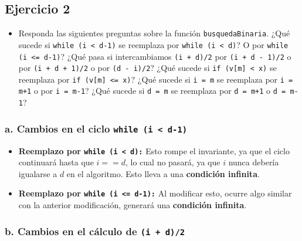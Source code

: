 \documentclass{article}
\begin{document}
    \subsection{Ejercicio 2}
        \begin{itemize}
            \item Responda las siguientes preguntas sobre la función \texttt{busquedaBinaria}. ¿Qué sucede si \texttt{while (i < d-1)} se reemplaza por \texttt{while (i < d)}? O por \texttt{while (i <= d-1)}? ¿Qué pasa si intercambiamos \texttt{(i + d)/2} por \texttt{(i + d - 1)/2} o por \texttt{(i + d + 1)/2} o por \texttt{(d - i)/2}? ¿Qué sucede si \texttt{if (v[m] < x)} se reemplaza por \texttt{if (v[m] <= x)}? ¿Qué sucede si \texttt{i = m} se reemplaza por \texttt{i = m+1} o por \texttt{i = m-1}? ¿Qué sucede si \texttt{d = m} se reemplaza por \texttt{d = m+1} o \texttt{d = m-1}? 
        \end{itemize}

        \subsubsection*{a. Cambios en el ciclo \texttt{while (i < d-1)}}
            \begin{itemize}
                \item \textbf{Reemplazo por \texttt{while (i < d):}} Esto rompe el invariante, ya que el ciclo continuará hasta que \( i == d \), lo cual no pasará, ya que \( i \) nunca debería igualarse a \( d \) en el algoritmo. Esto lleva a una \textbf{condición infinita}.
                
                \item \textbf{Reemplazo por \texttt{while (i <= d-1):}} Al modificar esto, ocurre algo similar con la anterior modificación, generará una \textbf{condición infinita}.
            \end{itemize}
            
        \subsubsection*{b. Cambios en el cálculo de \texttt{(i + d)/2}}
            
\end{document}

